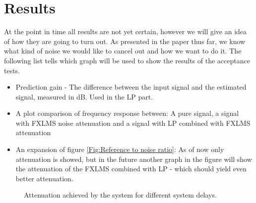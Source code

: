 \section*{Results}

At the point in time all results are not yet certain, however we will give an idea of how they are going to turn out.
As presented in the paper thus far, we know what kind of noise we would like to cancel out and how we want to do it. The following list tells which graph will be used to show the results of the acceptance tests.

\begin{itemize}
\item Prediction gain - The difference between the input signal and the estimated signal, measured in dB. Used in the LP part.
\item A plot comparison of frequency response between: A pure signal, a signal with FXLMS noise attenuation and a signal with LP combined with FXLMS attenuation
\item An expansion of figure \autoref{Fig:Reference to noise ratio}: As of now only attenuation is showed, but in the future another graph in the figure will show the attenuation of the FXLMS combined with LP - which should yield even better attenuation.

\end{itemize}


\begin{figure}[H]
	\centering
	
	\caption{Attenuation achieved by the system for different system delays.}
	\label{Fig:Reference to noise ratio}
\end{figure}


